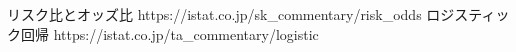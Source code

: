 \documentclass{ltjsarticle}
\begin{document}
\begin{thebibliography}{1}
     リスク比とオッズ比 https://istat.co.jp/sk\_commentary/risk\_odds
     ロジスティック回帰 https://istat.co.jp/ta\_commentary/logistic
\end{thebibliography}
\end{document}
